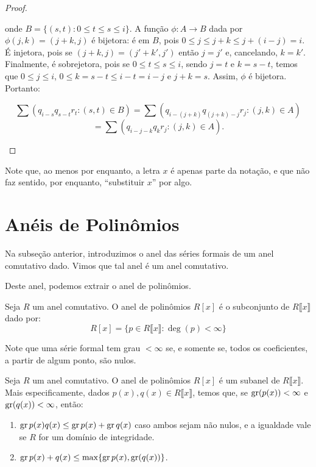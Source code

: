 \begin{proof}
\begin{itemize}
        onde $B=\{(s, t): 0\leq t\leq s\leq i\}$. A função $\phi: A\rightarrow B$ dada por $\phi(j, k)=(j+k, j)$ é bijetora: é em $B$, pois $0\leq j\leq j+k\leq j+(i-j)=i$. É injetora, pois se $(j+k, j)=(j'+k', j')$ então $j=j'$ e, cancelando, $k=k'$. Finalmente, é sobrejetora, pois se $0\leq t\leq s\leq i$, sendo $j=t$ e $k=s-t$, temos que $0\leq j\leq i$, $0\leq k=s-t\leq i-t=i-j$ e $j+k=s$. Assim, $\phi$ é bijetora. Portanto:

        $$\sum\left(q_{i-s}q_{s-t}r_t:(s, t)\in B\right)=\sum\left(q_{i-(j+k)}q_{(j+k)-j}r_j:(j, k)\in A\right)$$$$=\sum\left(q_{i-j-k}q_{k}r_j:(j, k)\in A\right).$$
    \end{itemize}
\end{proof}

Note que, ao menos por enquanto, a letra $x$ é apenas parte da notação, e que não faz sentido, por enquanto, ``substituir $x$'' por algo.
\section{Anéis de Polinômios}
Na subseção anterior, introduzimos o anel das séries formais de um anel comutativo dado. Vimos que tal anel é um anel comutativo.

Deste anel, podemos extrair o anel de polinômios.

\begin{definition}
Seja $R$ um anel comutativo. O anel de polinômios $R[x]$ é o subconjunto de $R\llbracket x \rrbracket$ dado por:
$$R[x]=\{p \in R\llbracket x \rrbracket: \deg(p) < \infty\}$$
\end{definition}

Note que uma série formal tem grau $<\infty$ se, e somente se, todos os coeficientes, a partir de algum ponto, são nulos.

\begin{lemma}
    Seja $R$ um anel comutativo. O anel de polinômios $R[x]$ é um subanel de $R\llbracket x \rrbracket$. Mais especificamente, dados $p(x), q(x) \in R\llbracket x \rrbracket$, temos que, se $\operatorname{gr}(p(x)) < \infty$ e $\operatorname{gr}(q(x)) < \infty$, então:

    \begin{enumerate}[label=\alph*)]
        \item $\operatorname{gr} p(x)q(x)\leq\operatorname{gr} p(x)+\operatorname{gr} q(x)$ caso ambos sejam não nulos, e a igualdade vale se $R$ for um domínio de integridade.
        \item $\operatorname{gr} p(x)+q(x)\leq \max\{\operatorname{gr} p(x),\operatorname{gr}(q(x))\}$.
    \end{enumerate}
\end{lemma}

